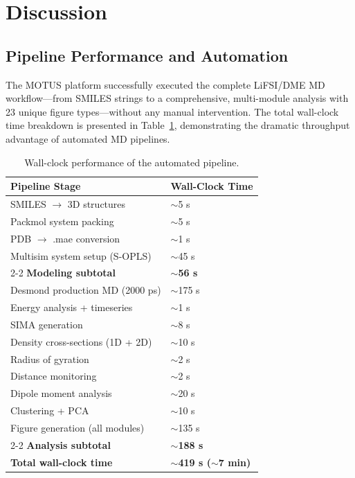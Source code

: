 \documentclass[twocolumn,10pt]{article}
\begin{document}
\section{Discussion}
\label{sec:discussion}

\subsection{Pipeline Performance and Automation}

The MOTUS platform successfully executed the complete LiFSI/DME MD workflow---from SMILES strings to a comprehensive, multi-module analysis with 23 unique figure types---without any manual intervention. The total wall-clock time breakdown is presented in Table~\ref{tab:performance}, demonstrating the dramatic throughput advantage of automated MD pipelines.

\begin{table}[!ht]
\centering
\caption{Wall-clock performance of the automated pipeline.}
\label{tab:performance}
\begin{tabular}{p{}p{}}
\toprule
Pipeline Stage & Wall-Clock Time \\
\midrule
SMILES $\rightarrow$ 3D structures & $\sim$5 s \\
Packmol system packing & $\sim$5 s \\
PDB $\rightarrow$ .mae conversion & $\sim$1 s \\
Multisim system setup (S-OPLS) & $\sim$45 s \\
\cmidrule{2-2}
\textbf{Modeling subtotal} & \textbf{$\sim$56 s} \\
\midrule
Desmond production MD (2000 ps) & $\sim$175 s \\
\midrule
Energy analysis + timeseries & $\sim$1 s \\
SIMA generation & $\sim$8 s \\
Density cross-sections (1D + 2D) & $\sim$10 s \\
Radius of gyration & $\sim$2 s \\
Distance monitoring & $\sim$2 s \\
Dipole moment analysis & $\sim$20 s \\
Clustering + PCA & $\sim$10 s \\
Figure generation (all modules) & $\sim$135 s \\
\cmidrule{2-2}
\textbf{Analysis subtotal} & \textbf{$\sim$188 s} \\
\midrule
\textbf{Total wall-clock time} & \textbf{$\sim$419 s ($\sim$7 min)} \\
\bottomrule
\end{tabular}
\end{table}
\end{document}
